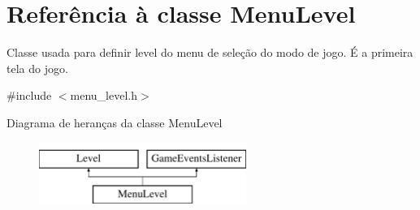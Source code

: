\hypertarget{classMenuLevel}{}\section{Referência à classe Menu\+Level}
\label{classMenuLevel}


Classe usada para definir level do menu de seleção do modo de jogo. É a primeira tela do jogo.  




{\ttfamily \#include $<$menu\+\_\+level.\+h$>$}

Diagrama de heranças da classe Menu\+Level\begin{figure}[H]
\begin{center}
\leavevmode
\includegraphics[height=2.000000cm]{classMenuLevel}
\end{center}
\end{figure}
